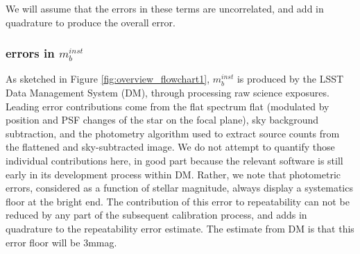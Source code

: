 \documentclass[12pt,preprint]{aastex}
\begin{document}
We will assume that the errors in these terms are uncorrelated, and add in quadrature to produce the overall error.

\subsubsection{errors in $m_b^{inst}$}
As sketched in Figure \ref{fig:overview_flowchart1}, $m_b^{inst}$ is produced by the LSST Data Management System (DM), through processing raw science exposures. Leading error contributions come from the flat spectrum flat (modulated by position and PSF
changes of the star on the focal plane), sky background subtraction, and the photometry algorithm used to extract source counts from the flattened and sky-subtracted image. We do not attempt to quantify those individual contributions here, in good part because the relevant software is still early in its development process within DM. Rather, we note that photometric errors, considered as a function of stellar magnitude, always display a systematics floor at the bright end. The contribution of this error to repeatability can not be reduced by any part of the subsequent calibration process, and adds in quadrature to the repeatability error estimate. The estimate from DM is that this error floor will be 3mmag. 
\end{document}
